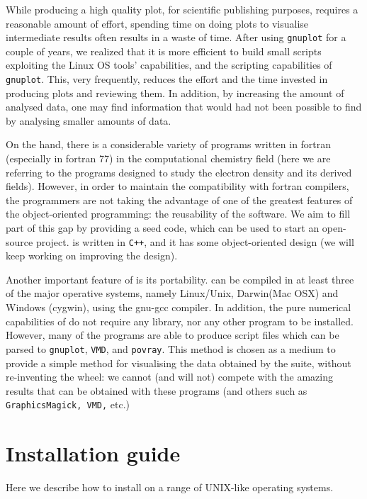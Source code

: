 While producing a high quality plot, for scientific publishing purposes, requires a reasonable
amount of effort, spending time on doing plots to visualise intermediate results often results
in a waste of time. After using \texttt{gnuplot} for a couple of years, we realized that
it is more efficient to build small scripts exploiting the Linux OS tools' capabilities, and
the scripting capabilities of \texttt{gnuplot}. This, very frequently, reduces the effort and
the time invested in producing plots and reviewing them. In addition, by increasing the amount
of analysed data, one may find information that would had not been possible to find 
by analysing smaller amounts of data. 

On the hand, there is a considerable variety of programs written in fortran (especially in
fortran 77) in the computational chemistry field (here we are referring to the programs
designed to study the electron density and its derived fields). However, in order to maintain the
compatibility with fortran compilers, the programmers are not taking the advantage of one of
the greatest features of the object-oriented programming: the reusability of the software.
We aim to fill part of this gap by providing a seed code, which can be used to start an
open-source project. \DTK{} is written in \texttt{C++}, and it has some object-oriented 
design (we will keep working on improving the design).

Another important feature of \DTK{} is its portability. \DTK{} can be compiled in at least three of the major
operative systems, namely Linux/Unix, Darwin(Mac OSX) and Windows (cygwin), using the gnu-gcc compiler.
In addition, the pure numerical capabilities of \DTK{} do not require any library, nor any other
program to be installed. However, many of the programs are able to produce script files
which can be parsed to \texttt{gnuplot}, \texttt{VMD}, and \texttt{povray}. This method is chosen as a
medium to provide a simple method for visualising the data obtained by the suite, without
re-inventing the wheel: we cannot (and will not) compete with the amazing results that can 
be obtained with these programs (and others such as \texttt{GraphicsMagick, VMD,} etc.)

\section{Installation guide}

Here we describe how to install \DTK{} on a range of UNIX-like operating systems.

